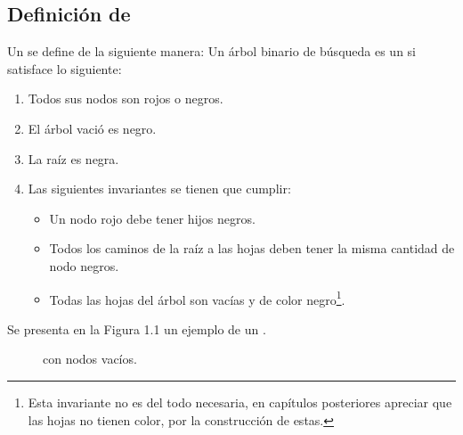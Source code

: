 \subsection{Definici\'on de {\arns}}
Un {\arn} se define de la siguiente manera:
Un \'arbol binario de búsqueda es un {\arn} si satisface lo siguiente:
\begin{enumerate}
    \item Todos sus nodos son rojos o negros.
    \item El \'arbol vació es negro.
    \item La raíz es negra.
    \item Las siguientes invariantes se tienen que cumplir:
    \begin{itemize}
        \item Un nodo rojo debe tener hijos negros.
        \item Todos los caminos de la raíz a las hojas deben tener la misma cantidad de nodo
        negros.
        \item Todas las hojas del \'arbol son vacías y de color negro\footnote{Esta invariante no
        es del todo necesaria, en capítulos posteriores apreciar que las hojas no tienen color,
        por la construcción de estas.}.
    \end{itemize}
\end{enumerate}

Se presenta en la Figura 1.1 un ejemplo de un {\arn}.

\begin{figure}
\centering
\captionsetup{justification=centering}
\label{arbolRB}
\caption {\Arn con nodos vac\'ios.}
\end{figure}

